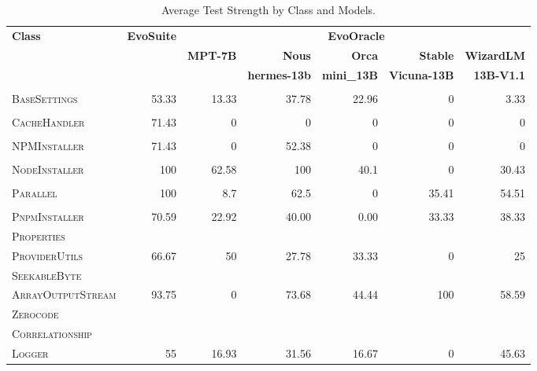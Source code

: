 \begin{table}[H]
\centering

\begin{tabular}{| l | r | r | r | r | r | r |}
\hline
\multirow{2}{*}{\textbf{Class}} & \multirow{2}{*}{\textbf{EvoSuite}} & \multicolumn{5}{c|}{\textbf{EvoOracle}} \\ %
\cline{3-7} %
 &  & \textbf{MPT-7B} & \textbf{Nous} & \textbf{Orca} & \textbf{Stable} & \textbf{WizardLM} \\
 &  &  & \textbf{hermes-13b} & \textbf{mini\_13B} & \textbf{Vicuna-13B} & \textbf{13B-V1.1} \\
\hline
\scriptsize\textsc{} &  &  &  &  &  &  \\
\scriptsize\textsc{BaseSettings} & 53.33 & 13.33 & 37.78 & 22.96 & 0 & 3.33 \\
\hline
\scriptsize\textsc{} &  &  &  &  &  &  \\
\scriptsize\textsc{CacheHandler} & 71.43 & 0 & 0 & 0 & 0 & 0 \\
\hline
\scriptsize\textsc{} &  &  &  &  &  &  \\
\scriptsize\textsc{NPMInstaller} & 71.43 & 0 & 52.38 & 0 & 0 & 0 \\
\hline
\scriptsize\textsc{} &  &  &  &  &  &  \\
\scriptsize\textsc{NodeInstaller} & 100 & 62.58 & 100 & 40.1 & 0 & 30.43 \\
\hline
\scriptsize\textsc{} &  &  &  &  &  &  \\
\scriptsize\textsc{Parallel} & 100 & 8.7 & 62.5 & 0 & 35.41 & 54.51 \\
\hline
\scriptsize\textsc{} &  &  &  &  &  &  \\
\scriptsize\textsc{PnpmInstaller} & 70.59 & 22.92 & 40.00 & 0.00 & 33.33 & 38.33 \\
\hline
\scriptsize\textsc{Properties} &  &  &  &  &  &  \\
\scriptsize\textsc{ProviderUtils} & 66.67 & 50 & 27.78 & 33.33 & 0 & 25 \\
\hline
\scriptsize\textsc{SeekableByte} &  &  &  &  &  &  \\
\scriptsize\textsc{ArrayOutputStream} & 93.75 & 0 & 73.68 & 44.44 & 100 & 58.59 \\
\hline
\scriptsize\textsc{Zerocode} &  &  &  &  &  &  \\
\scriptsize\textsc{Correlationship} &  &  &  &  &  &  \\
\scriptsize\textsc{Logger} & 55 & 16.93 & 31.56 & 16.67 & 0 & 45.63 \\
\hline

\end{tabular}
\caption{Average Test Strength by Class and Models.}
\label{tab:test_strength}
\end{table}

